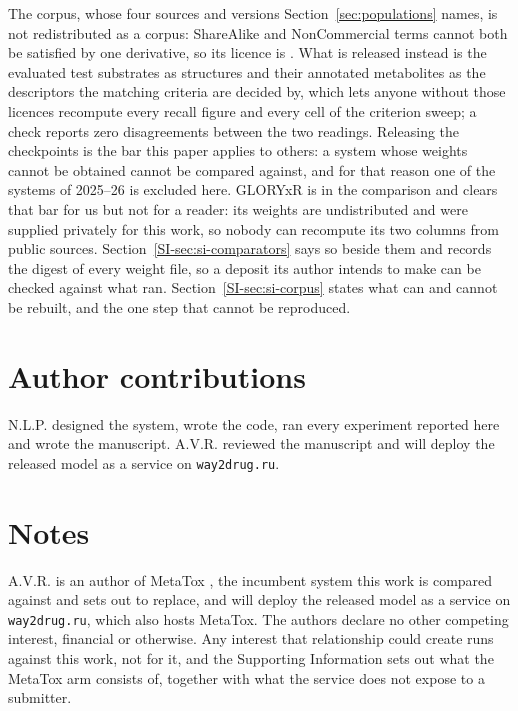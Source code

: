 The corpus, whose four sources and versions Section~\ref{sec:populations} names, is not
redistributed as a corpus: ShareAlike and NonCommercial terms cannot
both be satisfied by one derivative, so its licence is \CorpusLicence{}. What is released instead
is the evaluated test substrates as structures and their annotated metabolites as the descriptors
the matching criteria are decided by, which lets anyone without those licences recompute every
recall figure and every cell of the criterion sweep; a check reports zero disagreements between the
two readings. Releasing the checkpoints is the bar this paper applies to others: a system whose weights cannot
be obtained cannot be compared against, and for that reason one of the \numComparatorsUnavailable{}
systems of 2025--26 is excluded here. GLORYxR is in the comparison and clears that bar for us but
not for a reader: its weights are undistributed and were supplied privately for this work, so nobody can
recompute its two columns from public sources. Section~\ref{SI-sec:si-comparators} says so
beside them and records the digest of every weight file, so a deposit its author intends to make can
be checked against what ran.
Section~\ref{SI-sec:si-corpus} states what can and cannot be rebuilt, and the one step that
cannot be reproduced.

\section{Author contributions}

N.L.P. designed the system, wrote the code, ran every experiment reported here and wrote the
manuscript. A.V.R. reviewed the manuscript and will deploy the released model as a service on
\texttt{way2drug.ru}.

\begin{acknowledgement}

\Funding{}

\AIUse{}

\end{acknowledgement}

\section*{Notes}

A.V.R. is an author of MetaTox \citep{Rudik_2017}, the incumbent system this work is
compared against and sets out to replace, and will deploy the released model as a service on
\texttt{way2drug.ru}, which also hosts MetaTox. The authors declare no other competing interest,
financial or otherwise. Any interest that relationship could create runs against this work, not
for it, and the Supporting Information sets out what the MetaTox arm consists of, together with
what the service does not expose to a submitter.
